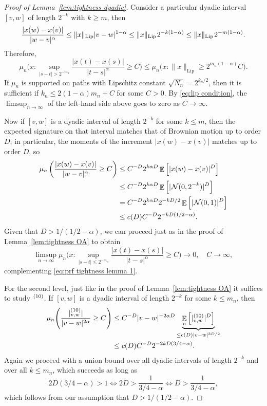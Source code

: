 \documentclass[11pt, letterpaper]{article}
\let\sig\relax
\DeclareMathOperator{\sig}{S}
\theoremstyle{definition}
\theoremstyle{remark}
\DeclareMathOperator{\E}{\mathbb{E}}
\newcommand{\m}{\hspace{0.25mm}}
\begin{document}
\begin{appendices}
\begin{proof}[Proof of Lemma~\ref{lem:tightness dyadic}]
    Consider a particular dyadic interval $[v,w]$ of length $2^{-k}$ with $k \ge m$, then \[
    \frac{|x(w)-x(v)|}{|w-v|^\alpha} \le \|x\|_\text{Lip} |v-w|^{1-\alpha} \le \|x\|_\text{Lip}\m 2^{-k(1-\alpha)} \le \|x\|_\text{Lip}\m 2^{-m(1-\alpha)}.
    \] Therefore, 
    \begin{equation}\label{eq:prf tightness lemma 1}
    \mu_n\Bigg( x\colon \sup_{|s-t| > 2^{-m_n}} \frac{|x(t)-x(s)|}{|t-s|^\alpha} \ge C\Bigg) \le \mu_n\Big(x\colon \|x\|_\text{Lip} \ge 2^{m_n(1-\alpha)} C\Big).
    \end{equation}
    If $\mu_n$ is supported on paths with Lipschitz constant $\sqrt{N_n} = 2^{k_n / 2}$, then it is sufficient if $k_n \le 2(1-\alpha) m_n + C$ for some $C > 0$. By \eqref{eq:lip condition}, the $\limsup_{n\to \infty}$ of the left-hand side above goes to zero as $C\to \infty$.

    Now if $[v,w]$ is a dyadic interval of length $2^{-k}$ for some $k \le m$, then the expected signature on that interval matches that of Brownian motion up to order $D$; in particular, the moments of the increment $|x(w)-x(v)|$ matches up to order $D$, so 
    \begin{align*}
        \mu_n \left( \frac{|x(w)-x(v)|}{|w-v|^\alpha} \ge C\right)
        &\le C^{-D} 2^{k\alpha D} \E\Big[|x(w)-x(v)|^D\Big]\\
        &\le C^{-D} 2^{k\alpha D} \E\Big[|\m\mathcal{N}(0,2^{-k})|^D\Big]\\
        &= C^{-D} 2^{k\alpha D} 2^{-kD / 2} \E\Big[|\m\mathcal{N}(0,1)|^D\Big]\\
        &\le c(D) C^{-D} 2^{-kD (1/2 - \alpha)}.
    \end{align*}
    Given that $D > 1 / (1/2 - \alpha)$, we can proceed just as in the proof of Lemma~\ref{lem:tightness OA} to obtain \[
    \limsup_{n\to \infty}\mu_n\Bigg( x\colon \sup_{|s-t| \le 2^{-m_n}} \frac{|x(t)-x(s)|}{|t-s|^\alpha} \ge C\Bigg) \longrightarrow 0,\quad C \to \infty,
    \] 
    complementing \eqref{eq:prf tightness lemma 1}.
    
    For the second level, just like in the proof of Lemma~\ref{lem:tightness OA} it suffices to study $\sig^{(10)}$. If $[v,w]$ is a dyadic interval of length $2^{-k}$ for some $k \le m_n$, then
    \begin{align*}
        \mu_n\Bigg(\frac{|\sig^{(10)}_{v,w}|}{|v-w|^{2\alpha}} \ge C\Bigg)
        &\le C^{-D} |v-w|^{-2\alpha D} \underbrace{\E_n\left[ |\sig^{(10)}_{v,w}|^D\right]}_{\le c(D) |v-w|^{3D/2}}\\
        &\le c(D) C^{-D} 2^{-2kD(3/4-\alpha)}.
    \end{align*}
    Again we proceed with a union bound over all dyadic intervals of length $2^{-k}$ and over all $k \le m_n$, which succeeds as long as \[
    2D(3/4 - \alpha) > 1 \iff 2D > \frac{1}{3/4-\alpha} \iff D > \frac{1}{3/4 - \alpha},
    \] which follows from our assumption that $D > 1 / (1/2 - \alpha)$.


\end{proof}
\end{appendices}
\end{document}
